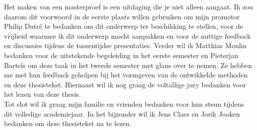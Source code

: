 \documentclass[master=cws,masteroption=mmc]{kulemt}
\begin{document}
\begin{preface}
  Het maken van een masterproef is een uitdaging die je niet alleen aangaat. Ik zou daarom dit voorwoord in de eerste plaats willen gebruiken om mijn promotor Philip Dutré te bedanken om dit onderwerp ter beschikking te stellen, voor de vrijheid waarmee ik dit onderwerp mocht aanpakken en voor de nuttige feedback en discussies tijdens de tussentijdse presentaties.
  Verder wil ik Matthias Moulin bedanken voor de uitstekende begeleiding in het eerste semester en Pieterjan Bartels om deze taak in het tweede semester met glans over te nemen. Ze hebben me met hun feedback geholpen bij het vormgeven van de ontwikkelde methoden en deze thesistekst. Hiernaast wil ik nog graag de voltallige jury bedanken voor het lezen van deze thesis.\\

  Tot slot wil ik graag mijn familie en vrienden bedanken voor hun steun tijdens dit volledige academiejaar. In het bijzonder wil ik Jens Claes en Jorik Jooken bedanken om deze thesistekst na te lezen.
\end{preface}

\tableofcontents*
\end{document}
